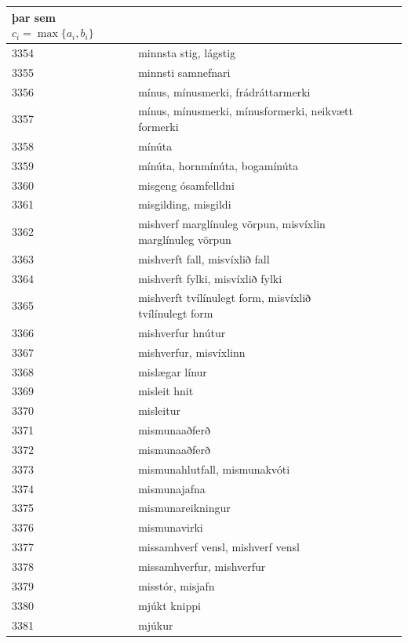 \begin{longtable}{p{}|p{}|p{}|p{}|p{}}
þar sem $c_{i}=\max\{a_{i}, b_{i}\}$ &  \\
\hline
3354 & minnsta stig, lágstig &  &  &  \\
\hline
3355 & minnsti samnefnari &  &  &  \\
\hline
3356 & mínus, mínusmerki, frádráttarmerki &  &  &  \\
\hline
3357 & mínus, mínusmerki, mínusformerki, neikvætt formerki &  &  &  \\
\hline
3358 & mínúta &  &  &  \\
\hline
3359 & mínúta, hornmínúta, bogamínúta &  &  &  \\
\hline
3360 & misgeng ósamfelldni &  &  &  \\
\hline
3361 & misgilding, misgildi &  &  &  \\
\hline
3362 & mishverf marglínuleg vörpun, misvíxlin marglínuleg vörpun &  &  &  \\
\hline
3363 & mishverft fall, misvíxlið fall &  &  &  \\
\hline
3364 & mishverft fylki, misvíxlið fylki &  &  &  \\
\hline
3365 & mishverft tvílínulegt form, misvíxlið tvílínulegt form &  &  &  \\
\hline
3366 & mishverfur hnútur &  &  &  \\
\hline
3367 & mishverfur, misvíxlinn &  &  &  \\
\hline
3368 & mislægar línur &  &  &  \\
\hline
3369 & misleit hnit &  &  &  \\
\hline
3370 & misleitur &  &  &  \\
\hline
3371 & mismunaaðferð &  &  &  \\
\hline
3372 & mismunaaðferð &  &  &  \\
\hline
3373 & mismunahlutfall, mismunakvóti &  &  &  \\
\hline
3374 & mismunajafna &  &  &  \\
\hline
3375 & mismunareikningur &  &  &  \\
\hline
3376 & mismunavirki &  &  &  \\
\hline
3377 & missamhverf vensl, mishverf vensl &  &  &  \\
\hline
3378 & missamhverfur, mishverfur &  &  &  \\
\hline
3379 & misstór, misjafn &  &  &  \\
\hline
3380 & mjúkt knippi &  &  &  \\
\hline
3381 & mjúkur &  &  &  \\
\hline

\end{longtable}
